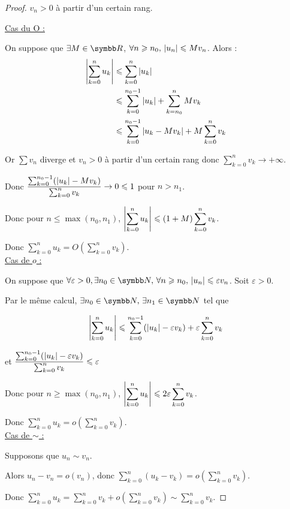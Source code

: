 \begin{proof} $v_n > 0$ à partir d'un certain rang.
    
    \uline{Cas du O :}

    \svspace On suppose que $\exists M \in \R$, $\forall n \geqslant n_0, \, \left|u_n\right| \leqslant M v_n$.
    Alors :
    \begin{align*}
        \left|\sum_{k = 0 }^{n } u_k\right| & \leqslant \sum_{k=0 }^{n } \left|u_k\right| \\
                                    & \leqslant \sum_{k = 0}^{n_0 - 1} \left|u_k\right| + \sum_{k = n_0}^{n } M v_k \\
                                    & \leqslant \sum_{k = 0}^{n_0 - 1} \left|u_k - M v_k\right| + M \sum_{k = 0}^{n } v_k \\
    \end{align*} 

    Or $\sum v_n$ diverge et $v_n > 0$ à partir d'un certain rang donc $\sum_{k = 0}^{n } v_k \to + \infty$.

    \svspace Donc $\displaystyle \frac{\sum_{k = 0 }^{n_0 - 1} (\left|u_k\right| - M v_k)}{\sum_{k = 0}^n v_k} \to 0 \leqslant 1$ pour $n > n_1$.

    \svspace Donc pour $\displaystyle n \leqslant \max(n_0, n_1)$, $\displaystyle \left|\sum_{k = 0 }^{n } u_k\right| \leqslant \left( 1 + M \right) \sum_{k = 0}^{n } v_k$.

    Donc $\displaystyle \sum_{k = 0}^{n } u_k = O\left( \sum_{k = 0}^{n } v_k \right)$. \\

    \uline{Cas de $o$ :}

    \svspace On suppose que $\forall \varepsilon > 0, \exists n_0 \in \N, \, \forall n \geqslant n_0, \, \abs{u_n} \leqslant \varepsilon v_n$.
    Soit $\varepsilon > 0$. 

    Par le même calcul, $\exists n_0 \in \N, \, \exists n_1 \in \N$ tel que 

    \[\left|\sum_{k = 0 }^{n } u_k\right| \leqslant \sum_{k = 0}^{n_0 - 1} (\left|u_k\right| - \varepsilon v_k) + \varepsilon \sum_{k = 0}^{n } v_k\]

    et $\displaystyle \frac{\sum_{k = 0 }^{n_0 - 1} (\left|u_k\right| - \varepsilon v_k)}{\sum_{k = 0}^{n } v_k} \leqslant \varepsilon$ 

    \svspace Donc pour $n \geqslant \max(n_0, n_1)$, $\displaystyle \left|\sum_{k = 0 }^{n } u_k\right| \leqslant 2 \varepsilon \sum_{k = 0}^{n } v_k$.

    Donc $\displaystyle \sum_{k = 0}^{n } u_k = o\left( \sum_{k = 0}^{n } v_k \right)$. \\

    \uline{Cas de $\sim$ :}

    \svspace Supposons que $u_n \sim v_n$.

    Alors $\displaystyle u_n - v_n = o(v_n)$, donc $\displaystyle \sum_{k = 0}^{n } (u_k - v_k) = o\left( \sum_{k = 0}^{n } v_k \right)$.

    Donc $\displaystyle \sum_{k = 0}^{n } u_k = \sum_{k = 0}^{n } v_k + o\left( \sum_{k = 0}^{n } v_k \right) \sim \sum_{k = 0}^{n } v_k$.
\end{proof} 

